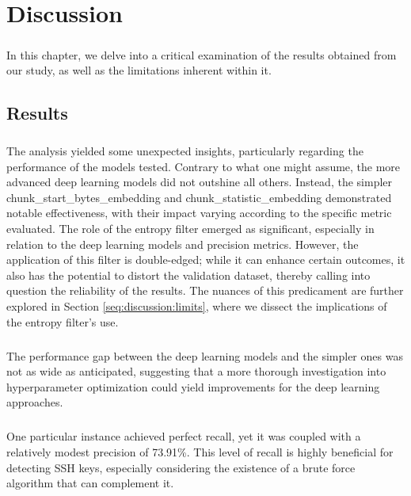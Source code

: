 \chapter{Discussion}\label{chap:discussion}

\paragraph{}In this chapter, we delve into a critical examination of the results obtained from our study, as well as the limitations inherent within it.

\section{Results}
\paragraph{}The analysis yielded some unexpected insights, particularly regarding the performance of the models tested. Contrary to what one might assume, the more advanced deep learning models did not outshine all others. Instead, the simpler chunk\_start\_bytes\_embedding and chunk\_statistic\_embedding demonstrated notable effectiveness, with their impact varying according to the specific metric evaluated. The role of the entropy filter emerged as significant, especially in relation to the deep learning models and precision metrics. However, the application of this filter is double-edged; while it can enhance certain outcomes, it also has the potential to distort the validation dataset, thereby calling into question the reliability of the results. The nuances of this predicament are further explored in Section \ref{seq:discussion:limits}, where we dissect the implications of the entropy filter's use.

\paragraph{}The performance gap between the deep learning models and the simpler ones was not as wide as anticipated, suggesting that a more thorough investigation into hyperparameter optimization could yield improvements for the deep learning approaches.

\paragraph{}One particular instance achieved perfect recall, yet it was coupled with a relatively modest precision of 73.91\%. This level of recall is highly beneficial for detecting SSH keys, especially considering the existence of a brute force algorithm that can complement it.

